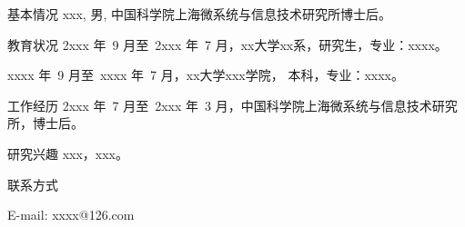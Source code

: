 
\begin{resume}

\begin{resumesection}{基本情况}
xxx, 男, 中国科学院上海微系统与信息技术研究所博士后。
\end{resumesection}


\begin{resumelist}{教育状况}
2xxx 年~9 月至~2xxx 年~7
月，xx大学xx系，研究生，专业：xxxx。
 
xxxx 年~9 月至~xxxx 年~7 月，xx大学xxx学院，
本科，专业：xxxx。
\end{resumelist}

\begin{resumelist}{工作经历}
 2xxx 年~7 月至~2xxx 年~3
 月，中国科学院上海微系统与信息技术研究所，博士后。
\end{resumelist}

\begin{resumelist}{研究兴趣}
xxx，xxx。
\end{resumelist}

\begin{resumelist}{联系方式}

E-mail: xxxx@126.com
\end{resumelist}

\end{resume}